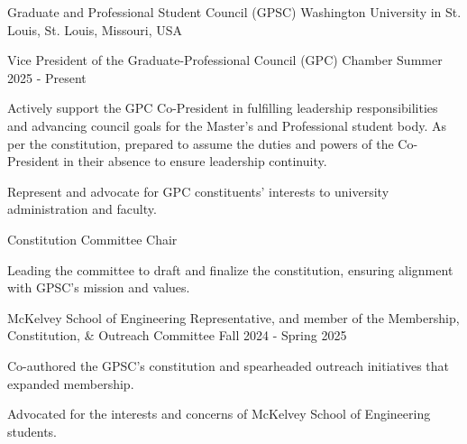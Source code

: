 \documentclass[10pt, letterpaper]{article}
\begin{document}
\begin{leadershipentry}
  {Graduate and Professional Student Council (GPSC)} %
  {Washington University in St. Louis, St. Louis, Missouri, USA} %
  \begin{positionentry}
    {Vice President of the Graduate-Professional Council (GPC) Chamber} %
    {Summer 2025 - Present} %
    \item Actively support the GPC Co-President in fulfilling leadership responsibilities and advancing council goals for the Master's and Professional student body. As per the constitution, prepared to assume the duties and powers of the Co-President in their absence to ensure leadership continuity.
    \item Represent and advocate for GPC constituents' interests to university administration and faculty.
  \end{positionentry}
  \begin{positionentry}
    {Constitution Committee Chair} %
    {} %
    \item Leading the committee to draft and finalize the constitution, ensuring alignment with GPSC's mission and values.
  \end{positionentry}
  \begin{positionentry}
    {McKelvey School of Engineering Representative, and member of the Membership, Constitution, \& Outreach Committee} %
    {Fall 2024 - Spring 2025} %
    \item Co-authored the GPSC's constitution and spearheaded outreach initiatives that expanded membership.
    \item Advocated for the interests and concerns of McKelvey School of Engineering students.
  \end{positionentry}
\end{leadershipentry}
\end{document}

